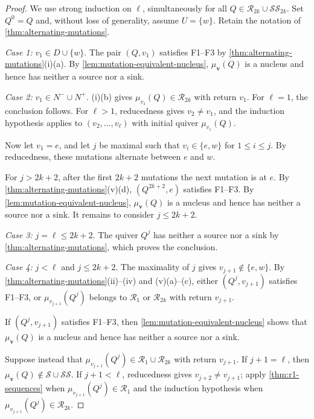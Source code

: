 \documentclass[10pt,a4paper]{amsart}
\theoremstyle{definition}
\theoremstyle{definition}
\numberwithin{equation}{section}
\numberwithin{table}{section}
\newcommand{\nminus}{N^{-}}
\newcommand{\nplus}{N^{+}}
\newcommand{\Rclass}{\mathcal{R}}
\newcommand{\SSclass}{\mathcal{SS}}
\newcommand{\Sclass}{\mathcal{S}}
\newcommand{\Qalt}[1]{Q^{#1}}
\begin{document}
\begin{proof}
We use strong induction on $\ell$, simultaneously for all
$Q\in\Rclass_{2k}\cup\SSclass_{2k}$. Set $\Qalt{0}=Q$ and, without loss of
generality, assume $U=\{w\}$. Retain the notation of
\cref{thm:alternating-mutations}.

\emph{Case 1:} $v_1\in D\cup\{w\}$.
The pair
$(Q,v_1)$ satisfies F1--F3 by
\cref{thm:alternating-mutations}\textup{(i)(a)}. By
\cref{lem:mutation-equivalent-nucleus}, $\mu_{\mathbf v}(Q)$ is a nucleus
and hence has neither a source nor a sink.

\emph{Case 2:} $v_1\in\nminus\cup\nplus$.
\textup{(i)(b)} gives
$\mu_{v_1}(Q)\in\Rclass_{2k}$ with return $v_1$. For $\ell=1$, the conclusion
follows. For $\ell>1$, reducedness gives $v_2\ne v_1$, and the induction
hypothesis applies to $(v_2,\ldots,v_\ell)$ with initial quiver
$\mu_{v_1}(Q)$.

Now let $v_1=e$, and let $j$ be maximal such that
$v_i\in\{e,w\}$ for $1\le i\le j$. By reducedness, these mutations alternate
between $e$ and $w$.

For $j>2k+2$, after the first $2k+2$ mutations the next mutation is at $e$.
By \cref{thm:alternating-mutations}\textup{(v)(d)},
$(\Qalt{2k+2},e)$ satisfies F1--F3. By
\cref{lem:mutation-equivalent-nucleus}, $\mu_{\mathbf v}(Q)$ is a nucleus
and hence has neither a source nor a sink. It remains to consider $j\le2k+2$.

\emph{Case 3:} $j=\ell\le2k+2$.
The quiver $\Qalt{j}$ has neither a source nor a sink by
\cref{thm:alternating-mutations}, which proves the conclusion.

\emph{Case 4:} $j<\ell$ and $j\le2k+2$.
The maximality of $j$ gives $v_{j+1}\notin\{e,w\}$. By
\cref{thm:alternating-mutations}\textup{(ii)--(iv) and (v)(a)--(c)}, either
$(\Qalt{j},v_{j+1})$ satisfies F1--F3, or
$\mu_{v_{j+1}}(\Qalt{j})$ belongs to $\Rclass_1$ or $\Rclass_{2k}$ with
return $v_{j+1}$.

If $(\Qalt{j},v_{j+1})$ satisfies F1--F3, then
\cref{lem:mutation-equivalent-nucleus} shows that $\mu_{\mathbf v}(Q)$ is a
nucleus and hence has neither a source nor a sink.

Suppose instead that
$\mu_{v_{j+1}}(\Qalt{j})\in\Rclass_1\cup\Rclass_{2k}$ with
return $v_{j+1}$. If $j+1=\ell$, then
$\mu_{\mathbf v}(Q)\notin\Sclass\cup\SSclass$. If $j+1<\ell$, reducedness
gives $v_{j+2}\ne v_{j+1}$; apply \cref{thm:r1-sequences} when
$\mu_{v_{j+1}}(\Qalt{j})\in\Rclass_1$ and the induction hypothesis when
$\mu_{v_{j+1}}(\Qalt{j})\in\Rclass_{2k}$.
\end{proof}
\end{document}
